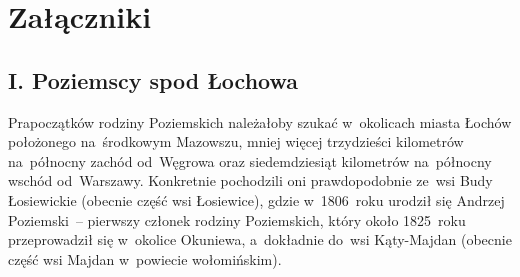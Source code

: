 
\clearpage
\null
\thispagestyle{empty}
\newpage

\begingroup
  \let\cleardoublepage\clearpage
  \chapter*{Załączniki}
\endgroup
\markboth{}{}

\par\bigskip

\par\bigskip

\par\bigskip

\par

\newpage
\renewcommand{\thefigure}{Z1.\arabic{figure}}
\setcounter{figure}{0}

\section*{I. Poziemscy spod Łochowa}
\label{sec:poziemscy}

Prapoczątków rodziny Poziemskich należałoby szukać w~okolicach miasta Łochów
położonego na~środkowym Mazowszu, mniej więcej trzydzieści kilometrów
na~północny zachód od~Węgrowa oraz siedemdziesiąt kilometrów na~północny
wschód od~Warszawy. Konkretnie pochodzili oni prawdopodobnie ze~wsi Budy
Łosiewickie (obecnie część wsi Łosiewice), gdzie w~1806~roku urodził się
Andrzej Poziemski~--
pierwszy członek rodziny Poziemskich, który około 1825~roku przeprowadził się
w~okolice Okuniewa, a~dokładnie do~wsi Kąty-Majdan (obecnie część wsi Majdan
w~powiecie wołomińskim).

